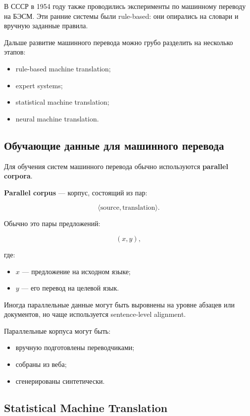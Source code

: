 \documentclass[a4paper,12pt]{article}
\begin{document}
В СССР в 1954 году также проводились эксперименты по машинному переводу на БЭСМ. Эти ранние системы были rule-based: они опирались на словари и вручную заданные правила.

Дальше развитие машинного перевода можно грубо разделить на несколько этапов:

\begin{itemize}
    \item rule-based machine translation;
    \item expert systems;
    \item statistical machine translation;
    \item neural machine translation.
\end{itemize}

\subsection{Обучающие данные для машинного перевода}

Для обучения систем машинного перевода обычно используются \textbf{parallel corpora}.

\textbf{Parallel corpus} --- корпус, состоящий из пар:

\[
\langle \text{source}, \text{translation} \rangle.
\]

Обычно это пары предложений:

\[
(x, y),
\]

где:

\begin{itemize}
    \item \(x\) --- предложение на исходном языке;
    \item \(y\) --- его перевод на целевой язык.
\end{itemize}

Иногда параллельные данные могут быть выровнены на уровне абзацев или документов, но чаще используется sentence-level alignment.

Параллельные корпуса могут быть:

\begin{itemize}
    \item вручную подготовлены переводчиками;
    \item собраны из веба;
    \item сгенерированы синтетически.
\end{itemize}

\subsection{Statistical Machine Translation}
\end{document}
